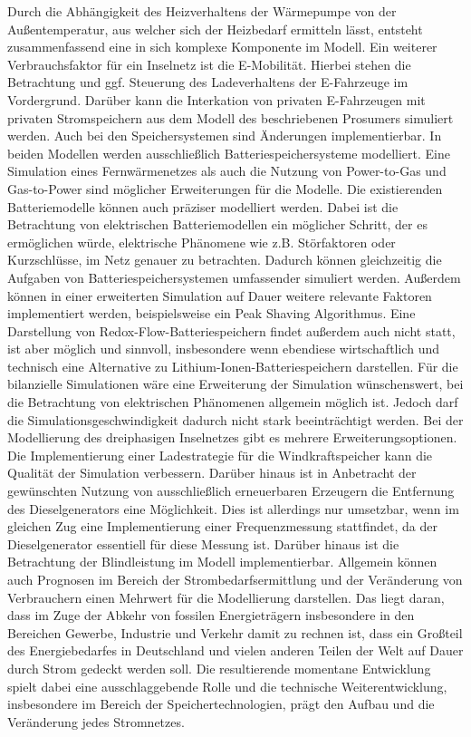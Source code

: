 Durch die Abhängigkeit des Heizverhaltens der Wärmepumpe von der Außentemperatur, aus welcher sich der Heizbedarf ermitteln lässt, entsteht zusammenfassend eine in sich komplexe Komponente im Modell.
Ein weiterer Verbrauchsfaktor für ein Inselnetz ist die E-Mobilität.
Hierbei stehen die Betrachtung und ggf. Steuerung des Ladeverhaltens der E-Fahrzeuge im Vordergrund.
Darüber kann die Interkation von privaten E-Fahrzeugen mit privaten Stromspeichern aus dem Modell des beschriebenen Prosumers simuliert werden.
Auch bei den Speichersystemen sind Änderungen implementierbar.
In beiden Modellen werden ausschließlich Batteriespeichersysteme modelliert.
Eine Simulation eines Fernwärmenetzes als auch die Nutzung von Power-to-Gas und Gas-to-Power sind möglicher Erweiterungen für die Modelle.
Die existierenden Batteriemodelle können auch präziser modelliert werden.
Dabei ist die Betrachtung von elektrischen Batteriemodellen ein möglicher Schritt, der es ermöglichen würde, elektrische Phänomene wie z.B. Störfaktoren oder Kurzschlüsse, im Netz genauer zu betrachten.
Dadurch können gleichzeitig die Aufgaben von Batteriespeichersystemen umfassender simuliert werden.
Außerdem können in einer erweiterten Simulation auf Dauer weitere relevante Faktoren implementiert werden, beispielsweise ein Peak Shaving Algorithmus.
Eine Darstellung von Redox-Flow-Batteriespeichern findet außerdem auch nicht statt, ist aber möglich und sinnvoll, insbesondere wenn ebendiese wirtschaftlich und technisch eine Alternative zu Lithium-Ionen-Batteriespeichern darstellen.
Für die bilanzielle Simulationen wäre eine Erweiterung der Simulation wünschenswert, bei die Betrachtung von elektrischen Phänomenen allgemein möglich ist. 
Jedoch darf die Simulationsgeschwindigkeit dadurch nicht stark beeinträchtigt werden.
Bei der Modellierung des dreiphasigen Inselnetzes gibt es mehrere Erweiterungsoptionen. 
Die Implementierung einer Ladestrategie für die Windkraftspeicher kann die Qualität der Simulation verbessern.
Darüber hinaus ist in Anbetracht der gewünschten Nutzung von ausschließlich erneuerbaren Erzeugern die Entfernung des Dieselgenerators eine Möglichkeit.
Dies ist allerdings nur umsetzbar, wenn im gleichen Zug eine Implementierung einer Frequenzmessung stattfindet, da der Dieselgenerator essentiell für diese Messung ist.
Darüber hinaus ist die Betrachtung der Blindleistung im Modell implementierbar.
Allgemein können auch Prognosen im Bereich der Strombedarfsermittlung und der Veränderung von Verbrauchern einen Mehrwert für die Modellierung darstellen.
Das liegt daran, dass im Zuge der Abkehr von fossilen Energieträgern insbesondere in den Bereichen Gewerbe, Industrie und Verkehr damit zu rechnen ist, dass ein Großteil des Energiebedarfes in Deutschland und vielen anderen Teilen der Welt auf Dauer durch Strom gedeckt werden soll.
Die resultierende momentane Entwicklung spielt dabei eine ausschlaggebende Rolle und die technische Weiterentwicklung, insbesondere im Bereich der Speichertechnologien, prägt den Aufbau und die Veränderung jedes Stromnetzes.

